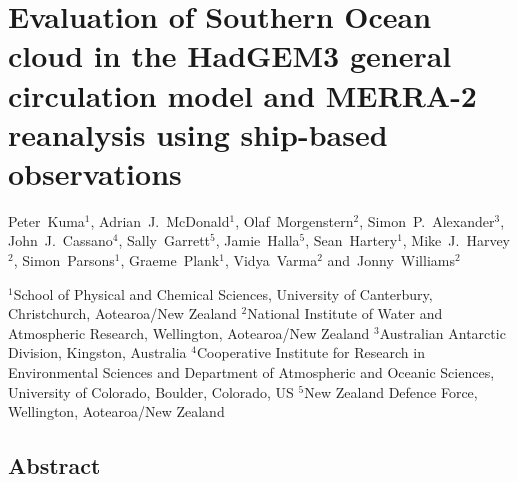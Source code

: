 \chapter{Evaluation of Southern Ocean cloud in the HadGEM3 general
circulation model and MERRA-2 reanalysis using ship-based
observations}

\vspace{-0.1cm}\begin{spacing}{1.2}\sffamily\raggedright
Peter~Kuma$^1$, Adrian~J.~McDonald$^1$, Olaf~Morgenstern$^2$, Simon~P.~Alexander$^3$, John~J.~Cassano$^4$, Sally~Garrett$^5$, Jamie~Halla$^5$, Sean~Hartery$^1$, Mike~J.~Harvey$^2$, Simon~Parsons$^1$, Graeme~Plank$^1$, Vidya~Varma$^2$ and~Jonny~Williams$^2$
\end{spacing}

\vspace{0.4cm}\begin{spacing}{1.2}\footnotesize\sffamily\noindent\raggedright
$^1$School of Physical and Chemical Sciences, University of Canterbury, Christchurch, Aotearoa/New Zealand\hfill\break
$^2$National Institute of Water and Atmospheric Research, Wellington, Aotearoa/New Zealand\hfill\break
$^3$Australian Antarctic Division, Kingston, Australia\hfill\break
$^4$Cooperative Institute for Research in Environmental Sciences and Department of Atmospheric and Oceanic Sciences, University of Colorado, Boulder, Colorado,
US\hfill\break
$^5$New Zealand Defence Force, Wellington, Aotearoa/New Zealand
\end{spacing}

\section*{Abstract}

